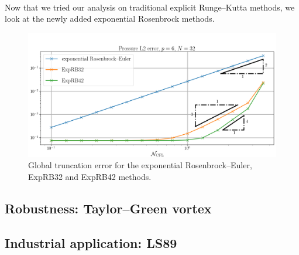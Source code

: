       \paragraph{}
      Now that we tried our analysis on traditional explicit Runge--Kutta methods, we look at the newly added exponential Rosenbrock methods.

      \begin{figure}
        \centering
        \includegraphics[width=\textwidth]{figures/covo_exp.png}
        \caption{Global truncation error for the exponential Rosenbrock--Euler, ExpRB32 and ExpRB42 methods.}
        \label{fig:covo_exp}
      \end{figure}


    \subsection{Robustness: Taylor--Green vortex}
    \subsection{Industrial application: LS89}
